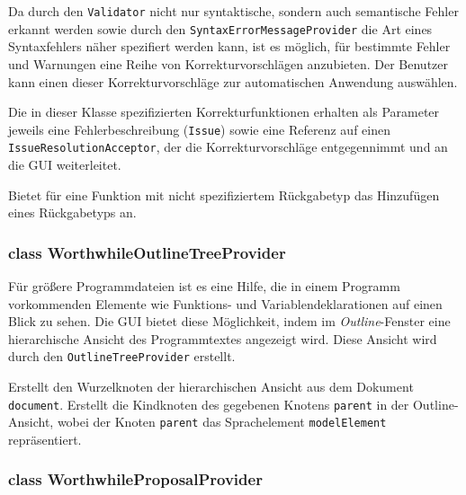 Da durch den \texttt{Validator} nicht nur syntaktische, sondern auch semantische Fehler erkannt werden sowie durch den \texttt{SyntaxErrorMessageProvider} die Art eines Syntaxfehlers näher spezifiert werden kann, ist es möglich, für bestimmte Fehler und Warnungen eine Reihe von Korrekturvorschlägen anzubieten. Der Benutzer kann einen dieser Korrekturvorschläge zur automatischen Anwendung auswählen.

Die in dieser Klasse spezifizierten Korrekturfunktionen erhalten als Parameter jeweils eine Fehlerbeschreibung (\texttt{Issue}) sowie eine Referenz auf einen \texttt{IssueResolutionAcceptor}, der die Korrekturvorschläge entgegennimmt und an die GUI weiterleitet.

\begin{description}
	 Bietet für eine Funktion mit nicht spezifiziertem Rückgabetyp das Hinzufügen eines Rückgabetyps an.
\end{description}

\subsubsection{class WorthwhileOutlineTreeProvider}

Für größere Programmdateien ist es eine Hilfe, die in einem Programm vorkommenden Elemente wie Funktions- und Variablendeklarationen auf einen Blick zu sehen. Die GUI bietet diese Möglichkeit, indem im \textit{Outline}-Fenster eine hierarchische Ansicht des Programmtextes angezeigt wird. Diese Ansicht wird durch den \texttt{OutlineTreeProvider} erstellt.

\begin{description}
	 Erstellt den Wurzelknoten der hierarchischen Ansicht aus dem Dokument \texttt{document}.
	 Erstellt die Kindknoten des gegebenen Knotens \texttt{parent} in der Outline-Ansicht, wobei der Knoten \texttt{parent} das Sprachelement \texttt{modelElement} repräsentiert.
\end{description}

\subsubsection{class WorthwhileProposalProvider}

